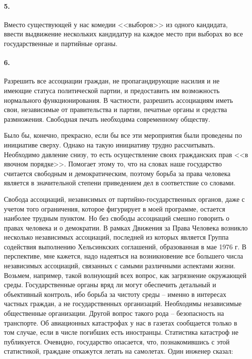 \documentclass{book}
\begin{document}
\paragraph{5.} Вместо существующей у нас комедии <<выборов>> из одно­го кандидата, ввести выдвижение нескольких кандидатур на каждое место при выборах во все государственные и партий­ные органы.

\paragraph{6.} Разрешить все ассоциации граждан, не пропагандирующие насилия и не имеющие статуса политической партии, и предоста­вить им возможность нормального функционирования. В частно­сти, разрешить ассоциациям иметь свои, независимые от прави­тельства и партии, печатные органы и средства размножения. Свободная печать необходима современному обществу.

Было бы, конечно, прекрасно, если бы все эти мероприятия были проведены по инициативе сверху. Однако на такую инициа­тиву трудно рассчитывать. Необходимо давление снизу, то есть осуществление своих гражданских прав <<в явочном порядке>>. Помогает этому то, что на словах наше государство считается свободным и демократическим, поэтому борьба за права челове­ка является в значительной степени приведением дел в соответ­ствие со словами.

Свобода ассоциаций, независимых от партийно-государствен­ных органов, даже с учетом того ограничения, которое фигури­рует в моей программе, остается наиболее трудным пунктом. Но без свободы ассоциаций смешно говорить о правах человека и о демократии. В рамках Движения за Права Человека возникло несколько независимых ассоциаций, последней из которых яв­ляется Группа содействия выполнению Хельсинкских соглаше­ний, образованная в мае 1976 г. В перспективе, мне кажется, на­до надеяться на возникновение все большего числа независимых ассоциаций, связанных с самыми различными аспектами жизни. Возьмем, например, такой волнующий всех вопрос, как загряз­нение окружающей среды. Государственные органы вряд ли мо­гут обеспечить детальный и объективный контроль, ибо борьба за чистоту среды -- именно в интересах частных граждан, а не го­сударственных организаций. Необходимы независимые общест­венные организации. Другой вопрос такого рода -- безопасность на транспорте. Об авиационных катастрофах у нас в газетах сооб­щается 
только в том случае, если в числе погибших есть иност­ранцы. Статистика катастроф не публикуется. Очевидно, госу­дарство опасается, что, познакомившись с этой статистикой, граждане откажутся летать на самолетах. Один инженер сказал:
\end{document}
